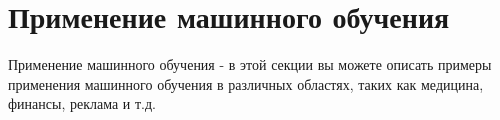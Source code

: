 
\section{Применение машинного обучения}\label{sec:model_evaluation}
Применение машинного обучения - в этой секции вы можете описать примеры применения машинного обучения в различных областях, таких как медицина, финансы, реклама и т.д.